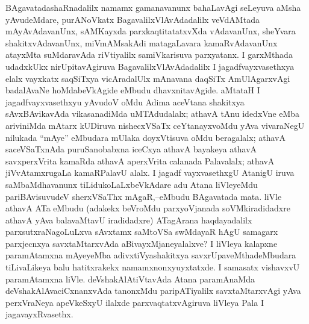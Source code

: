 BAgavatadashaRnadalilx namamx gamanavanunx bahaLavAgi seLeyuva aMsha yAvu\-deMdare, purANoVkatx BagavalilxVlAvAdadalilx veVdAMtada mAyAvAdavanUnx, sAMKayxda parxkaqtitatatxvXda vAdavanUnx, sheYvara shakitxvAdavanUnx, miVmAMsakAdi matagaLavara kamaRvAdavanUnx atayxMta suMdaravAda riVtiyalilx samiVkarisuva parxyatanx. I garxMthada udadxkUkx nirUpitavAgiruva BagavalilxVlAvAdadalilx I jagadfvayxvasethxya elalx vayxkatx saqSiTxya vicAradalUlx mAnavana daqSiTx AmUlAgarxvAgi badalAvaNe hoMdabeVkAgide eMbudu dhavxnitavAgide. aMtataH I jagadfvayxvasethxyu yAvudoV oMdu Adima aceVtana shakitxya sAvxBAvikavAda vikasanadiMda uMTAdudalalx; athavA tAnu idedxVne eMba ariviniMda mAtarx kUDiruva nishecxVSaTx ceYtanayxvoMdu yAva vivaraNegU nilukada ``mAye'' eMbudara mUlaka doyxVtisuva oMdu beragalalx; athavA saceVSaTxnAda puruSanobabxna iceCxya athavA bayakeya athavA savxperxVrita kamaRda athavA aperxVrita calanada Palavalalx; athavA jiVvAtamxrugaLa kamaRPalavU alalx. I jagadf vayxvasethxgU AtanigU iruva saMbaMdhavanunx tiLidukoLaLxbeVkAdare adu Atana liVleyeMdu pariBAvisuvudeV sherxVSaThx mAgaR,--eMbudu BAgavatada mata. liVle athavA ATa eMbudu (adakekx beVroMdu parxyoVjanada soVMkiradidadxre athavA yAva balavaMtavU iradidadxre) ATagArana haqdayadalilx parxsutxraNagoLuLxva sAvxtamx saMtoVSa swMdayaR hAgU samagarx parxjecnxya savxtaMtarxvAda aBivayxMjaneyalalxve? I liVleya kalapxne paramAtamxna mAyeyeMba adivxtiVyashakitxya savxrUpaveMthadeMbudara tiLivaLikeya balu hatitxrakekx namamxnonxyuyxtatxde. I samasatx vishavxvU paramAtamxna liVle. deVshakAlAtiVtavAda Atana paramAnaMda deVshakAlAvaciCxnanxvAda tanonxMdu paripATiyalilx savxtaMtarxvAgi yAva perxVraNeya apeVkeSxyU ilalxde parxvaqtatxvAgiruva liVleya Pala I jagavayxRvasethx.

